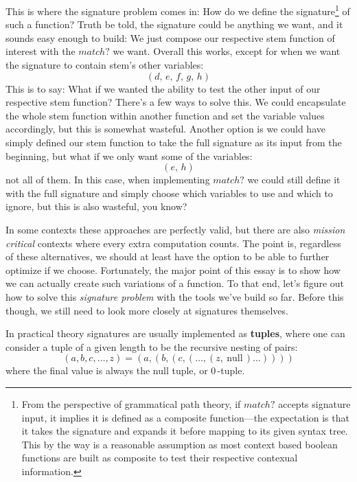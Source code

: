 \documentclass[twoside]{article}
\newcommand{\strong}[1]{{\bfseries #1}}
\begin{document}
This is where the signature problem comes in: How do we define the signature\footnote{From the perspective of grammatical
path theory, if $ match? $ accepts signature input, it implies it is defined as a composite function---the expectation
is that it takes the signature and expands it before mapping to its given syntax tree. This by the way is a reasonable
assumption as most context based boolean functions are built as composite to test their respective contexual information.}
of such a function? Truth be told, the signature could be anything we want, and it sounds easy enough to build: We just
compose our respective stem function of interest with the $ match? $ we want. Overall this works, except for when we want
the signature to contain stem's other variables:
$$ (d,\, e,\, f,\, g,\, h) $$
This is to say: What if we wanted the ability to test the other input of our respective stem function?
There's a few ways to solve this. We could encapsulate the whole stem function within another function and set the variable
values accordingly, but this is somewhat wasteful. Another option is we could have simply defined our stem function to take
the full signature as its input from the beginning, but what if we only want some of the variables:
$$ (e,\, h) $$
not all of them. In this case, when implementing $ match? $ we could still define it with the full signature and simply
choose which variables to use and which to ignore, but this is also wasteful, you know?

In some contexts these approaches are perfectly valid, but there are also \emph{mission critical} contexts where every
extra computation counts. The point is, regardless of these alternatives, we should at least have the option to be able
to further optimize if we choose. Fortunately, the major point of this essay is to show how we can actually create
such variations of a function. To that end, let's figure out how to solve this \emph{signature problem} with the tools
we've build so far. Before this though, we still need to look more closely at signatures themselves.

In practical theory signatures are usually implemented as \strong{tuples}, where one can consider a tuple of a given
length to be the recursive nesting of pairs:
$$ (a, b, c, \ldots, z) = (a, (b, (c, (\ldots, (z,\ \mbox{null}\,) \ldots )))) $$
where the final value is always the null tuple, or  $ 0\, $-tuple.
\end{document}
